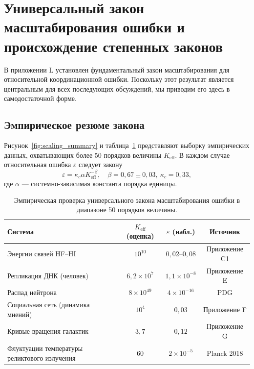 \documentclass[11pt]{article}
\theoremstyle{remark}
\newcommand{\Keff}{K_{\mathrm{eff}}}
\begin{document}
	\section{Универсальный закон масштабирования ошибки и происхождение степенных законов}
	\label{sec:scaling}
	
	В приложении L установлен фундаментальный закон масштабирования для относительной координационной ошибки. Поскольку этот результат является центральным для всех последующих обсуждений, мы приводим его здесь в самодостаточной форме.
	
	\subsection{Эмпирическое резюме закона}
	
	Рисунок~\ref{fig:scaling_summary} и таблица~\ref{tab:scaling_data} представляют выборку эмпирических данных, охватывающих более 50 порядков величины \(\Keff\). В каждом случае относительная ошибка \(\varepsilon\) следует закону
	\begin{equation}
		\varepsilon = \kappa_c \alpha \Keff^{-\beta}, \quad \beta = 0,67 \pm 0,03,\ \kappa_c = 0,33,
		\label{eq:error-scaling}
	\end{equation}
	где \(\alpha\) — системно-зависимая константа порядка единицы.
	
	\begin{table}[H]
		\centering
		\caption{Эмпирическая проверка универсального закона масштабирования ошибки в диапазоне 50 порядков величины.}
		\label{tab:scaling_data}
		\begin{tabular}{l c c c}
			\toprule
			\textbf{Система} & \(\Keff\) (оценка) & \(\varepsilon\) (набл.) & Источник \\
			\midrule
			Энергии связей HF–HI & \(10^{10}\) & \(0,02\)–\(0,08\) & Приложение C1 \\
			Репликация ДНК (человек) & \(6,2\times10^7\) & \(1,1\times10^{-8}\) & Приложение E \\
			Распад нейтрона & \(8\times10^{49}\) & \(4\times10^{-16}\) & PDG \\
			Социальная сеть (динамика мнений) & \(10^4\) & \(0,03\) & Приложение F \\
			Кривые вращения галактик & \(3,7\) & \(0,12\) & Приложение G \\
			Флуктуации температуры реликтового излучения & \(60\) & \(2\times10^{-5}\) & Planck 2018 \\
			\bottomrule
		\end{tabular}
	\end{table}
	
\end{document}
